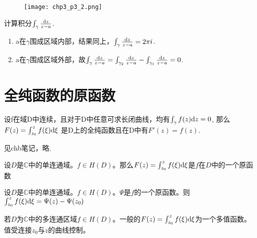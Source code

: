 \begin{figure}[h]
	\centering
	\texttt{[image: chp3\_p3\_2.png]}
\end{figure}

\begin{eg}
	计算积分$\int_\gamma \frac{\mathrm{d}z}{z - a}$.
\end{eg}
\begin{jie}{}
	\begin{enumerate}[(1)]
		\item a在$\gamma$围成区域内部，结果同上，$\int_\gamma \frac{\mathrm{d}z}{z-a} = 2\pi i$.
		\item a在$\gamma$围成区域外部，故$\int_\gamma \frac{\mathrm{d}z}{z-a} = \int_{\gamma_2} \frac{\mathrm{d}z}{z -a} - \int_{\gamma_1} \frac{\mathrm{d}z}{z-a} = 0$.
	\end{enumerate}
\end{jie}


\section{全纯函数的原函数}
\begin{mypro}
	设f在域D中连续，且对于D中任意可求长闭曲线，均有$\int_\gamma f(z) \mathrm{d}z = 0$, 那么$F(z) = \int_{z_0}^{z} f(\xi) \mathrm{d}\xi$ 是D上的全纯函数且在D中有$F'(z) = f(z)$.
\end{mypro}
\begin{mypro}
	见chb笔记，略.
\end{mypro}





\begin{mypro}
	设$D$是$\mathbb{C}$中的单连通域。$f\in H(D)$。那么$F(z)=\int_{z_0}^{z}f(\xi)\mathrm{d}\xi$是$f$在$D$中的一个原函数
\end{mypro}
\begin{mypro}
	设$D$是$\mathbb{C}$中的单连通域。$f\in H(D)$。$\Psi$是$f$的一个原函数。则$\int_{z_0}^{z}f(\xi)\mathrm{d}\xi=\Psi(z)-\Psi(z_0)$
\end{mypro}

若$D$为$\mathbb{C}$中的多连通区域$f\in H(D)$。一般的$F(z)=\int_{z_0}^{z}f(\xi)\mathrm{d}\xi$为一个多值函数。值受连接$z_0$与$z$的曲线控制。

